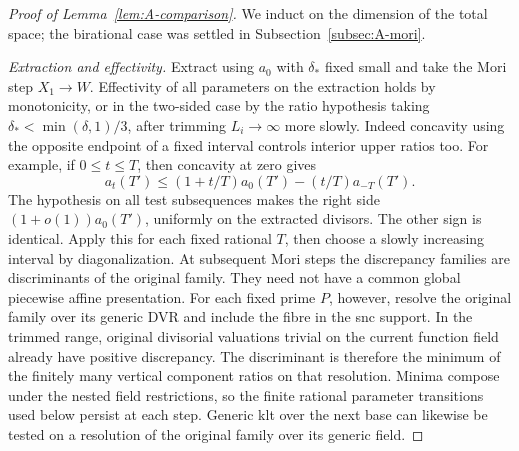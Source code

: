 \begin{proof}[Proof of Lemma~\ref{lem:A-comparison}]
We induct on the dimension of the total space; the birational case was
settled in Subsection~\ref{subsec:A-mori}.

\emph{Extraction and effectivity.}
Extract using \(a_0\) with \(\delta_*\) fixed small and take the Mori
step \(X_1\to W\).
Effectivity of all parameters on the extraction holds by monotonicity, or in the two-sided case by the ratio hypothesis taking \(\delta_*<\min(\delta,1)/3\), after trimming \(L_i\to\infty\) more slowly.
Indeed concavity using the opposite endpoint of a fixed interval controls interior upper ratios too.
For example, if \(0\le t\le T\), then concavity at zero gives
\[
 a_t(T')\le (1+t/T)a_0(T')-(t/T)a_{-T}(T').
\]
The hypothesis on all test subsequences makes the right side
\((1+o(1))a_0(T')\), uniformly on the extracted divisors.
The other sign is identical.  Apply this for each fixed rational
\(T\), then choose a slowly increasing interval by diagonalization.
At subsequent Mori steps the discrepancy families are discriminants of
the original family.  They need not have a common global piecewise
affine presentation.  For each fixed prime \(P\), however, resolve the
original family over its generic DVR and include the fibre in the snc
support.  In the trimmed range, original divisorial valuations trivial
on the current function field already have positive discrepancy.
The discriminant is therefore the minimum of the finitely many vertical
component ratios on that resolution.  Minima compose under the nested
field restrictions, so the finite rational parameter transitions used
below persist at each step.  Generic klt over the next base can likewise
be tested on a resolution of the original family over its generic field.


\end{proof}
